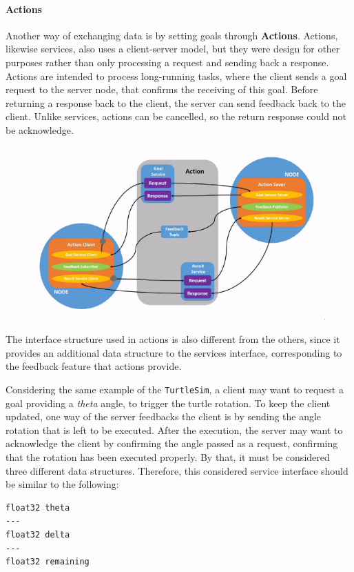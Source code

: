 \paragraph{Actions}

Another way of exchanging data is by setting goals through \textbf{Actions}. Actions, likewise services, also uses a client-server model, but they were design for other purposes rather than only processing a request and sending back a response. Actions are intended to process long-running tasks, where the client sends a goal request to the server node, that confirms the receiving of this goal. Before returning a response back to the client, the server can send feedback back to the client. Unlike services, actions can be cancelled, so the return response could not be acknowledge. 

\begin{figure}[H]
    \centering
    \includegraphics[width=0.7\linewidth]{images/ros2-actions.png}
\end{figure}

The interface structure used in actions is also different from the others, since it provides an additional data structure to the services interface, corresponding to the feedback feature that actions provide.
                
Considering the same example of the \texttt{TurtleSim}, a client may want to request a goal providing a \textit{theta} angle, to trigger the turtle rotation. To keep the client updated, one way of the server feedbacks the client is by sending the angle rotation that is left to be executed. After the execution, the server may want to acknowledge the client by confirming the angle passed as a request, confirming that the rotation has been executed properly. By that, it must be considered three different data structures. Therefore, this considered service interface should be similar to the following:

\begin{verbatim}
float32 theta
---
float32 delta
---
float32 remaining
\end{verbatim}


